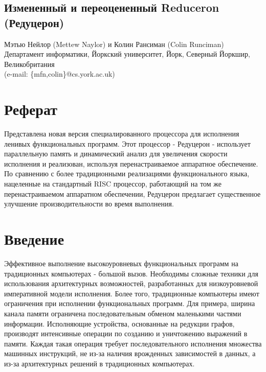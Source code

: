 \documentclass[flenqn, 14pt]{extarticle}
\begin{document}
\begin{center}
\section*{Измененный и переоцененный Reduceron (Редуцерон)}
\end{center}
\begin{center}
Мэтью Нейлор (Mettew Naylor) и Колин Рансиман (Colin Runciman) \\
Департамент информатики, Йоркский университет, Йорк, Северный Йоркшир, Великобритания \\
(e-mail: \{mfn,colin\}@cs.york.ac.uk)
\end{center}

\section*{Реферат}
Представлена новая версия специалированного процессора для исполнения ленивых функциональных программ. Этот процессор - Редуцерон - использует параллельную память и динамический анализ для увеличения скорости исполнения и реализован, используя перенастраиваемое аппаратное обеспечение. По сравнению с более традиционными реализациями функционального языка, нацеленные на стандартный RISC процессор, работающий на том же перенастраиваемом аппаратном обеспечении, Редуцерон предлагает существенное улучшение производительности во время выполнения.

\section{Введение}
Эффективное выполнение высокоуровневых функциональных программ на традиционных компьютерах - большой вызов. Необходимы сложные техники для использования архитектурных возможностей, разработанных для низкоуровневой императивной модели исполнения. Более того, традиционные компьютеры имеют ограничения при исполнении функциональных программ. Для примера, ширина канала памяти ограничена последовательным обменом маленькими частями информации. Исполняющие устройства, основанные на редукции графов, производят интенсивные операции по созданию и уничтожению выражений в памяти. Каждая такая операция требует последовательного исполнения множества машинных инструкций, не из-за наличия врожденных зависимостей в данных, а из-за архитектурных решений в традиционных компьютерах.
\end{document}
